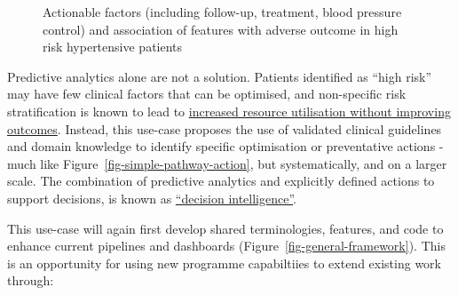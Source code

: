 \documentclass[
  letterpaper,
  DIV=11,
  numbers=noendperiod]{scrartcl}
\begin{document}
\begin{figure}


\caption{\label{fig-htn-actionable}Actionable factors (including
follow-up, treatment, blood pressure control) and association of
features with adverse outcome in high risk hypertensive patients}

\end{figure}%

Predictive analytics alone are not a solution. Patients identified as
``high risk'' may have few clinical factors that can be optimised, and
non-specific risk stratification is known to lead to
\href{https://bmjopen.bmj.com/content/9/6/e026470}{increased resource
utilisation without improving outcomes}. Instead, this use-case proposes
the use of validated clinical guidelines and domain knowledge to
identify specific optimisation or preventative actions - much like
Figure~\ref{fig-simple-pathway-action}, but systematically, and on a
larger scale. The combination of predictive analytics and explicitly
defined actions to support decisions, is known as
\href{https://www.gartner.com/en/information-technology/glossary/decision-intelligence}{``decision
intelligence''}.

This use-case will again first develop shared terminologies, features,
and code to enhance current pipelines and dashboards
(Figure~\ref{fig-general-framework}). This is an opportunity for using
new programme capabiltiies to extend existing work through:
\end{document}
